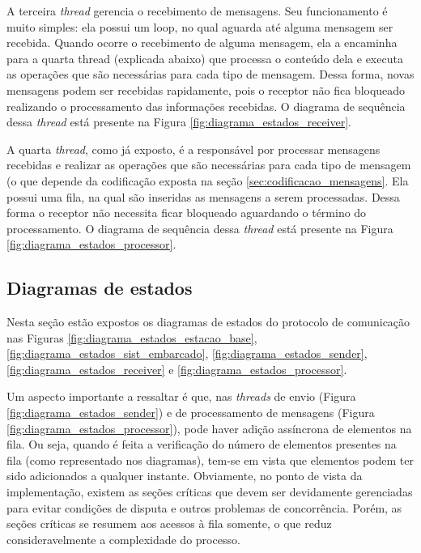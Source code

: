 A terceira \textit{thread} gerencia o recebimento de mensagens. Seu funcionamento é muito simples: ela possui um loop, no qual aguarda até alguma mensagem ser recebida. Quando ocorre o recebimento de alguma mensagem, ela a encaminha para a quarta thread (explicada abaixo) que processa o conteúdo dela e executa as operações que são necessárias para cada tipo de mensagem. Dessa forma, novas mensagens podem ser recebidas rapidamente, pois o receptor não fica bloqueado realizando o processamento das informações recebidas. O diagrama de sequência dessa \textit{thread} está presente na Figura \ref{fig:diagrama_estados_receiver}.

A quarta \textit{thread}, como já exposto, é a responsável por processar mensagens recebidas e realizar as operações que são necessárias para cada tipo de mensagem (o que depende da codificação exposta na seção \ref{sec:codificacao_mensagens}. Ela possui uma fila, na qual são inseridas as mensagens a serem processadas. Dessa forma o receptor não necessita ficar bloqueado aguardando o término do processamento. O diagrama de sequência dessa \textit{thread} está presente na Figura \ref{fig:diagrama_estados_processor}.

\subsection{Diagramas de estados}

Nesta seção estão expostos os diagramas de estados do protocolo de comunicação nas Figuras \ref{fig:diagrama_estados_estacao_base}, \ref{fig:diagrama_estados_sist_embarcado}, \ref{fig:diagrama_estados_sender}, \ref{fig:diagrama_estados_receiver} e \ref{fig:diagrama_estados_processor}.

Um aspecto importante a ressaltar é que, nas \textit{threads} de envio (Figura \ref{fig:diagrama_estados_sender}) e de processamento de mensagens (Figura \ref{fig:diagrama_estados_processor}), pode haver adição assíncrona de elementos na fila. Ou seja, quando é feita a verificação do número de elementos presentes na fila (como representado nos diagramas), tem-se em vista que elementos podem ter sido adicionados a qualquer instante. Obviamente, no ponto de vista da implementação, existem as seções críticas que devem ser devidamente gerenciadas para evitar condições de disputa e outros problemas de concorrência. Porém, as seções críticas se resumem aos acessos à fila somente, o que reduz consideravelmente a complexidade do processo.


